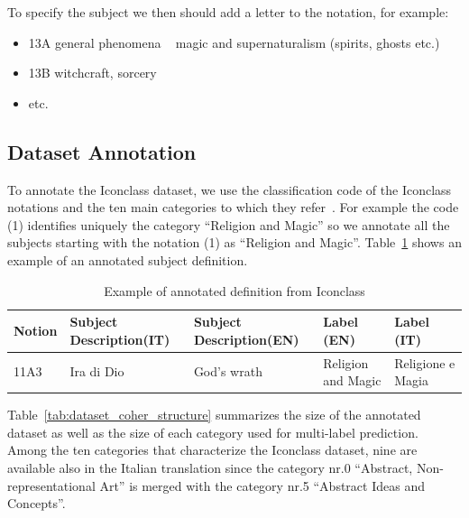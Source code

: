 \documentclass[epsfig,a4paper,12pt,titlepage]{book}
\begin{document}
To specify the subject we then should add a letter to the notation, for example: 
\begin{itemize}
    \item 13A general phenomena ~ magic and supernaturalism (spirits, ghosts etc.)
    \item 13B witchcraft, sorcery
    \item etc.
\end{itemize}
\subsection{Dataset Annotation}
To annotate the Iconclass dataset, we use the classification code of the Iconclass notations and the ten main categories to which they refer~\cite{grund1993iconclass}. For example the code (1) identifies uniquely  the category  ``Religion and Magic'' so we annotate all the subjects starting with the notation (1) as ``Religion and Magic''. Table~\ref{tab_annotation_icon} shows an example of an annotated subject definition.

\begin{table}[h!]
    \centering
    \begin{adjustbox}{width=\textwidth}
    \begin{tabular}{|p{1.5cm}|p{3.5cm}|p{3.5cm}|p{4.0cm}|p{4.0cm}|} \hline
    Notion  & Subject Description(IT) &Subject Description(EN)& Label (EN) & Label (IT) \\ \hline
    11A3 & Ira di Dio & God's wrath& Religion and Magic & Religione e Magia \\ \hline
    \hline
\end{tabular}
\end{adjustbox}
    \caption{Example of annotated definition from Iconclass}
		\label{tab_annotation_icon}       %
\end{table}

Table~\ref{tab:dataset_coher_structure} summarizes the size of the annotated dataset as well as the size of each category used for multi-label prediction. Among the ten categories that characterize the Iconclass dataset, nine are available also in the Italian translation since the category nr.0 ``Abstract, Non-representational Art'' is merged with the category nr.5 ``Abstract Ideas and Concepts''.  
\end{document}

